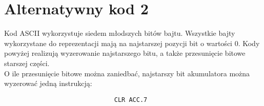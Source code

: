 \documentclass[a4paper,12pt]{extarticle}  %
\begin{document}
\section{Alternatywny kod 2}
Kod ASCII wykorzystuje siedem młodszych bitów bajtu.
Wszystkie bajty wykorzystane do reprezentacji mają na najstarszej pozycji bit o wartości 0.
Kody powyżej realizują wyzerowanie najstarszego bitu, a także przesunięcie bitowe starszej części.\\
O ile przesunięcie bitowe można zaniedbać, najstarszy bit akumulatora można wyzerować jedną instrukcją:
\begin{lstlisting}
                              CLR ACC.7
\end{lstlisting}
\end{document}
